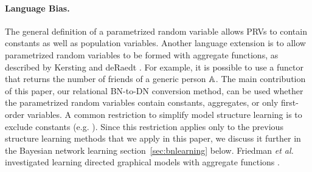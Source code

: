 \documentclass[runningheads,a4paper]{llncs}
\newcommand{\fixneeded}[1]{\textbf{[\footnotesize #1]}}
\newcommand{\iid}{i.i.d.}
\begin{document}
\paragraph{Language Bias.}
The general definition of a parametrized random variable allows PRVs to contain constants as well as population variables. Another language extension is to allow parametrized random variables to be formed with aggregate functions, as described by Kersting and deRaedt \cite{Kersting2007}. For example, it is possible to use a functor that returns the number of friends of a generic person $\mathbb{A}$. The main contribution of this paper, our relational BN-to-DN conversion method, can be used whether the parametrized random variables contain constants, aggregates, or only first-order variables. A common restriction to simplify model structure learning is to exclude constants (e.g. \cite{Friedman99prm,Domingos2009}). Since this restriction applies only to the previous structure learning methods that we apply in this paper, we discuss it further in the Bayesian network learning section~\ref{sec:bnlearning} below. Friedman {\em et al.} investigated learning directed graphical models with aggregate functions \cite{Friedman99prm}. 




%
%
\end{document}
